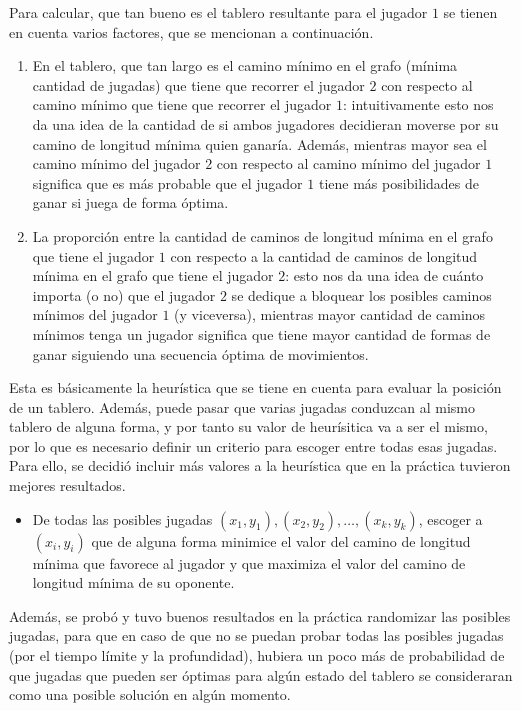 \documentclass[11pt]{article}
\begin{document}
Para calcular, que tan bueno es el tablero resultante para el jugador $1$ se tienen en cuenta varios factores, que se mencionan a continuación.

\begin{enumerate}
    \item En el tablero, que tan largo es el camino mínimo en el grafo (mínima cantidad de jugadas) que tiene que recorrer el jugador $2$ con respecto al camino mínimo que tiene que recorrer el jugador $1$: intuitivamente esto nos da una idea de la cantidad de si ambos jugadores decidieran moverse por su camino de longitud mínima quien ganaría. Además, mientras mayor sea el camino mínimo del jugador $2$ con respecto al camino mínimo del jugador $1$ significa que es más probable que el jugador $1$ tiene más posibilidades de ganar si juega de forma óptima.
    \item La proporción entre la cantidad de caminos de longitud mínima en el grafo que tiene el jugador $1$ con respecto a la cantidad de caminos de longitud mínima en el grafo que tiene el jugador $2$: esto nos da una idea de cuánto importa (o no) que el jugador $2$ se dedique a bloquear los posibles caminos mínimos del jugador $1$ (y viceversa), mientras mayor cantidad de caminos mínimos tenga un jugador significa que tiene mayor cantidad de formas de ganar siguiendo una secuencia óptima de movimientos.
\end{enumerate}

Esta es básicamente la heurística que se tiene en cuenta para evaluar la posición de un tablero. Además, puede pasar que varias jugadas conduzcan al mismo tablero de alguna forma, y por tanto su valor de heurísitica va a ser el mismo, por lo que es necesario definir un criterio para escoger entre todas esas jugadas. Para ello, se decidió incluir más valores a la heurística que en la práctica tuvieron mejores resultados.

\begin{itemize}
    \item De todas las posibles jugadas $(x_1, y_1), (x_2, y_2), \ldots, (x_k, y_k)$, escoger a $(x_i, y_i)$ que de alguna forma minimice el valor del camino de longitud mínima que favorece al jugador y que maximiza el valor del camino de longitud mínima de su oponente. 
\end{itemize}

Además, se probó y tuvo buenos resultados en la práctica randomizar las posibles jugadas, para que en caso de que no se puedan probar todas las posibles jugadas (por el tiempo límite y la profundidad), hubiera un poco más de probabilidad de que jugadas que pueden ser óptimas para algún estado del tablero se consideraran como una posible solución en algún momento.
\end{document}
